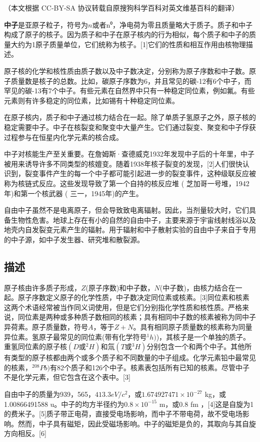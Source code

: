 
（本文根据 CC-BY-SA 协议转载自原搜狗科学百科对英文维基百科的翻译）

\textbf{中子}是亚原子粒子，符号为$n$或者n⁰，净电荷为零且质量略大于质子。质子和中子构成了原子的核子。因为质子和中子在原子核内的行为相似，每个质子和中子的质量大约为1原子质量单位，它们统称为核子。[1]它们的性质和相互作用由核物理描述。

原子核的化学和核性质由质子数以及中子数决定，分别称为原子序数和中子数。原子质量数是核子的总数。比如，碳原子序数为6，并且常见的碳-12有6个中子，而罕见的碳-13有7个中子。有些元素在自然界中只有一种稳定同位素，例如氟。有些元素则有许多稳定的同位素，比如锡有十种稳定同位素。

在原子核内，质子和中子通过核力结合在一起。除了单质子氢原子之外，原子核的稳定需要中子。中子在核裂变和聚变中大量产生。它们通过裂变、聚变和中子俘获过程参与在恒星内化学元素的核合成。

中子对核能生产至关重要。在詹姆斯·查德威克1932年发现中子后的十年里，中子被用来诱导许多不同类型的核嬗变。随着1938年核子裂变的发现，[2]人们很快认识到，裂变事件产生的每一个中子都可能引起进一步的裂变事件，这种级联反应被称为核链式反应。这些发现导致了第一个自持的核反应堆 ( 芝加哥一号堆，1942年)和第一个核武器 ( 三一，1945年)的产生。

自由中子虽然不是电离原子，但会导致致电离辐射。因此，当剂量较大时，它们具备生物性危害。地球上存在有小的自然的自由中子，主要来源于宇宙线射线浴以及地壳内自发裂变元素产生的辐射。用于辐射和中子散射实验的自由中子来自于专用的中子源，如中子发生器、研究堆和散裂源。

\subsection{描述}
原子核由许多质子形成，$Z$(原子序数)和中子数，$N$(中子数)，由核力结合在一起。原子序数定义原子的化学性质，中子数决定同位素或核素。[3]同位素和核素这两个术语经常被当作同义词使用，但是它们分别指化学性质和核性质。严格来说，同位素是两种或多种质子数相同的核素；具有相同中子数的核素被称为同中子异荷素。原子质量数，符号$A$，等于$Z+N$。具有相同原子质量数的核素称为同量异位素。氢原子最常见的同位素(带有化学符号${}^{1}h)$)，其核子是一个单独的质子。重氢同位素的原子核$(D\text{或}{}^{2}H)$和氚$(T\text{或}{}^{3}H)$分别包含一个和两个中子。其他所有类型的原子核都由两个或多个质子和不同数量的中子组成。化学元素铅中最常见的核素，${}^{208}Pb)$有82个质子和126个中子。核素表包括所有已知的核素。尽管中子不是化学元素，但它包含在这个表中。[3]

自由中子的质量为939，565，$413.3 eV /c^{2}$，或$1.674927471\times10^{-27}$ kg，或1.00866491588 u。中子的均方半径约为$0.8\times10^{-15}$ m，或0.8 fm ，[4]这是自旋为1的费米子。[5]质子带正电荷，直接受电场影响，而中子不带电荷，故不受电场影响。然而，中子具有磁矩，因此受磁场影响。中子的磁矩是负的，其取向与其自旋方向相反。[6]

